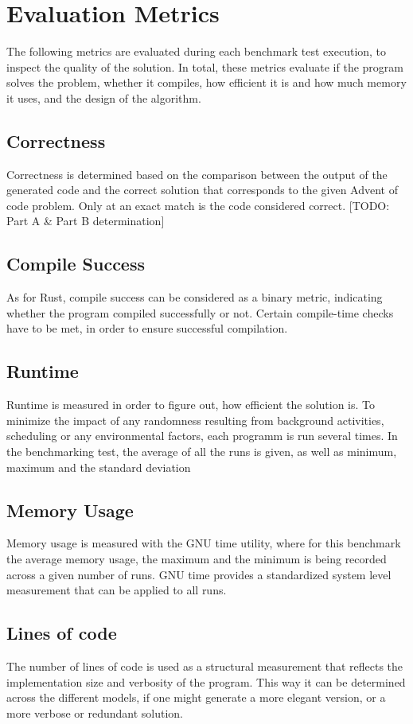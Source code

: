\documentclass[12pt,a4paper]{report}
\begin{document}
\section{Evaluation Metrics}
The following metrics are evaluated during each benchmark test execution, to inspect the quality of the solution. In total, these metrics evaluate if the program solves the problem, whether it compiles, how efficient it is and how much memory it uses, and the design of the algorithm.

\subsection{Correctness}
Correctness is determined based on the comparison between the output of the generated code and the correct solution that corresponds to the given Advent of code problem. Only at an exact match is the code considered correct. [TODO: Part A \& Part B determination]

\subsection{Compile Success}
As for Rust, compile success can be considered as a binary metric, indicating whether the program compiled successfully or not. Certain compile-time checks have to be met, in order to ensure successful compilation.
\subsection{Runtime}
Runtime is measured in order to figure out, how efficient the solution is. To minimize the impact of any randomness resulting from background activities, scheduling or any environmental factors, each programm is run several times. In the benchmarking test, the average of all the runs is given, as well as minimum, maximum and the standard deviation 
\subsection{Memory Usage}
Memory usage is measured with the GNU time utility, where for this benchmark the average memory usage, the maximum and the minimum is being recorded across a given number of runs. GNU time provides a standardized system level measurement that can be applied to all runs.

\subsection{Lines of code}
The number of lines of code is used as a structural measurement that reflects the implementation size and verbosity of the program. This way it can be determined across the different models, if one might generate a more elegant version, or a more verbose or redundant solution.
\end{document}
